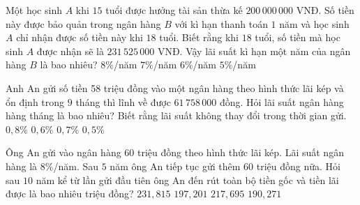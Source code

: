 \begin{ex}%
	Một học sinh $A$ khi $15$ tuổi được hưởng tài sản thừa kế $200\,000\,000$ VNĐ. Số tiền này được bảo quản trong ngân hàng $B$ với kì hạn thanh toán $1$ năm và học sinh $A$ chỉ nhận được số  tiền này khi $18$ tuổi. Biết rằng khi $18$ tuổi, số tiền mà học sinh $A$ được nhận sẽ là $231\,525\,000$ VNĐ. Vậy lãi suất kì hạn một năm của ngân hàng $B$ là bao nhiêu?
	\choice 
		 {$8 \%$/năm}
		 { $7\%$/năm}
		{\True $6 \%$/năm} 
		{$5\%$/năm} 
\end{ex}

\begin{ex}%
	Anh An gửi số tiền 58 triệu đồng vào một ngân hàng theo hình thức lãi kép và ổn định trong $9$ tháng thì lĩnh về được $61\,758\,000$ đồng. Hỏi lãi suất ngân hàng  hàng tháng là bao nhiêu? Biết rằng lãi suất không thay đổi trong thời gian gửi.
	\choice 
		 {$0{,}8 \%$}
		{  $0{,}6 \%$}
		 {\True $0{,}7 \%$}
		{$0{,}5\%$} 
\end{ex}

\begin{ex}%
	Ông An gửi vào ngân hàng $60$ triệu đồng theo hình thức lãi kép. Lãi suất ngân hàng là $8\%$/năm. Sau $5$ năm ông An tiếp tục  gửi thêm $60$ triệu đồng nữa. Hỏi sau $10$ năm kể từ lần gửi đầu tiên ông An đến rút toàn bộ tiền gốc và tiền lãi được là bao nhiêu triệu đồng?
	\choice 
		 {$231{,}815$}
		 { $197{,}201$}
		 {\True $217{,}695$}
		{$190{,}271$} 
\end{ex}

